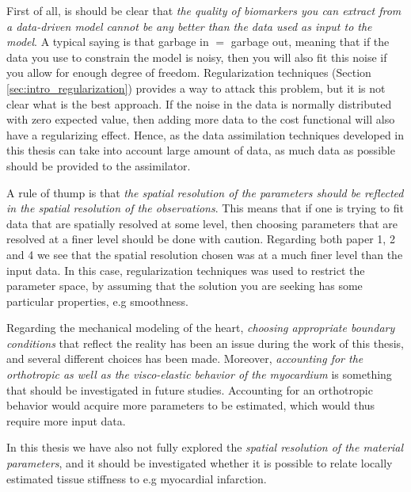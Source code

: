 First of all, is should be clear that \emph{the
  quality of biomarkers you can extract from a data-driven
  model cannot be any better than the data used as input to the
  model}. A typical saying is that garbage in $=$ garbage out,
meaning that if the data you use to constrain the model is noisy, then
you will also fit this noise if you allow for enough degree of
freedom. Regularization techniques (Section
\ref{sec:intro_regularization}) provides a way to attack this problem,
but it is not clear what is the best approach. If the noise in the
data is normally distributed with zero expected value, then adding
more data to the cost functional will also have a regularizing effect.
Hence, as the data assimilation techniques developed in this thesis
can take into account large amount of data, as much data as possible
should be provided to the assimilator.

A rule of thump is that \emph{the spatial resolution of the parameters should be
  reflected in the spatial resolution of the observations}. This means
that if one is trying to fit data that are spatially resolved at some level,
then choosing parameters that are resolved at a finer level should be
done with caution. Regarding both paper 1, 2 and 4 we see that the
spatial resolution chosen was at a much finer level than the input
data. In this case, regularization techniques was used to restrict the
parameter space, by assuming that the solution you are seeking has
some particular properties, e.g smoothness.



Regarding the mechanical modeling of the heart, 
\emph{choosing appropriate boundary conditions} that reflect the reality has
been an issue during the work of this thesis, and several different
choices has been made. Moreover, \emph{accounting for the orthotropic as
well as the visco-elastic behavior of the myocardium} is something that should
be investigated in future studies. Accounting for an orthotropic
behavior would acquire more parameters to be estimated, which would
thus require more input data.

In this thesis we have also not fully
explored the \emph{spatial resolution of the material parameters}, and it
should be investigated whether it is possible to relate locally estimated
tissue stiffness to e.g myocardial infarction.



